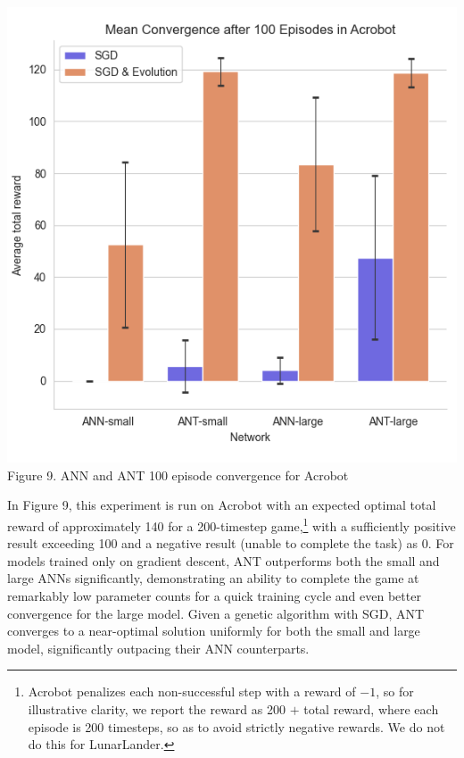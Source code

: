 \documentclass{article}
\begin{document}
\begin{multicols}{2}
	\begin{center}
	\includegraphics[scale=0.6]{figs/acrobot_convergence_reshaped.png}
	\small Figure 9. ANN and ANT 100 episode convergence for Acrobot
	\end{center}
	
	In Figure 9, this experiment is run on Acrobot with an expected optimal total reward of approximately 140 for a 200-timestep game,\footnote{Acrobot penalizes each non-successful step with a reward of $-1$, so for illustrative clarity, we report the reward as 200 $+$ total reward, where each episode is 200 timesteps, so as to avoid strictly negative rewards. We do not do this for LunarLander.} with a sufficiently positive result exceeding 100 and a negative result (unable to complete the task) as 0. For models trained only on gradient descent, ANT outperforms both the small and large ANNs significantly, demonstrating an ability to complete the game at remarkably low parameter counts for a quick training cycle and even better convergence for the large model. Given a genetic algorithm with SGD, ANT converges to a near-optimal solution uniformly for both the small and large model, significantly outpacing their ANN counterparts.
	

\end{multicols}
\end{document}
